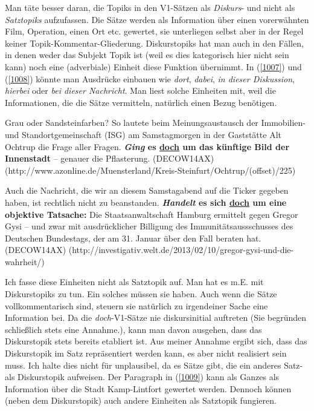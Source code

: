 {Man täte besser daran, die Topiks in den V1-Sätzen als \textit{Diskurs}- und  nicht als \textit{Satztopiks}  aufzufassen. Die Sätze werden als Information über einen vorerwähn\-ten Film, Operation, einen Ort etc. gewertet, sie unterliegen selbst aber in der Regel keiner Topik-Kommentar-Gliederung. Diskurstopiks hat man auch in den Fällen, in denen weder das Subjekt Topik ist (weil es dies kategorisch hier nicht sein kann) noch eine (adverbiale) Einheit diese Funktion übernimmt. In (\ref{1007}) und (\ref{1008}) könnte man Ausdrücke einbauen wie \textit{dort}, \textit{dabei}, \textit{in dieser Diskussion}, \textit{hierbei} oder \textit{bei dieser Nachricht}. Man liest solche Einheiten mit, weil die Informationen, die die Sätze vermitteln, natürlich einen Bezug benötigen.

\begin{exe}
	\ex\label{1007} 
	\scriptsize
	Grau oder Sandsteinfarben? So lautete beim Meinungsaustausch der Immobilien- und Standortgemeinschaft (ISG) am Samstagmorgen in der Gaststätte \glqq 		Alt Ochtrup\grqq{} die Frage aller Fragen. \textbf{\textit{Ging} es \underline{doch} um das künftige Bild der Innenstadt} – genauer die Pflasterung.   		\hfill\hbox {(DECOW14AX)}
	\newline
	\hbox{}\hfill\hbox{(http://www.azonline.de/Muensterland/Kreis-Steinfurt/Ochtrup/(offset)/225)}
\end{exe}	

\begin{exe}
	\ex\label{1008} 
	\scriptsize
	Auch die Nachricht, die wir an diesem Samstagabend auf die Ticker gegeben haben, ist rechtlich nicht zu beanstanden. \textbf{\textit{Handelt} es sich 		\underline{doch} um eine objektive Tatsache:} Die Staatsanwaltschaft Hamburg ermittelt gegen Gregor Gysi – und zwar mit ausdrücklicher Billigung des 		Immunitätsaussschusses des Deutschen Bundestags, der am 31. Januar über den Fall beraten hat.    		
	\hfill\hbox {(DECOW14AX)}
	\newline
	\hbox{}\hfill\hbox{(http://investigativ.welt.de/2013/02/10/gregor-gysi-und-die-wahrheit/)}
\end{exe}	
Ich fasse diese Einheiten nicht als Satztopik  auf. Man hat es m.E. mit Diskurstopiks  zu tun. Ein solches müssen sie haben. Auch wenn die Sätze vollkommentarisch sind, steuern sie natürlich zu irgendeiner Sache eine Information bei. Da die \textit{doch}-V1-Sätze nie diskursinitial auftreten (Sie begründen schließlich stets eine Annahme.), kann man davon ausgehen, dass das Diskurstopik stets bereits etabliert ist. Aus meiner Annahme ergibt sich, dass das Diskurstopik im Satz repräsentiert werden kann, es aber nicht realisiert sein muss. Ich halte dies nicht für unplausibel, da es Sätze gibt, die ein anderes Satz- als Diskurstopik aufweisen. Der Paragraph in (\ref{1009}) kann als Ganzes als Information über die Stadt Kamp-Lintfort gewertet werden. Dennoch können (neben dem Diskurstopik) auch andere Einheiten als Satztopik fungieren.

}

